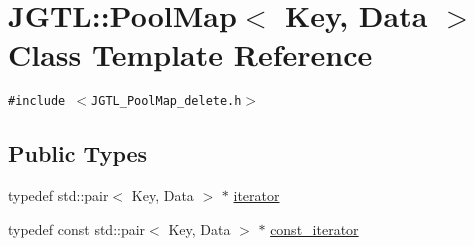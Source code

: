 \hypertarget{class_j_g_t_l_1_1_pool_map}{
\section{JGTL::Pool\-Map$<$ Key, Data $>$ Class Template Reference}
\label{class_j_g_t_l_1_1_pool_map}
}
{\tt \#include $<$JGTL\_\-Pool\-Map\_\-delete.h$>$}

\subsection*{Public Types}
\begin{CompactItemize}
\item 
typedef std::pair$<$ Key, Data $>$ $\ast$ \hyperlink{class_j_g_t_l_1_1_pool_map_b3af40821696ebcf9f62a3e9d91324ee}{iterator}
\item 
typedef const std::pair$<$ Key, Data $>$ $\ast$ \hyperlink{class_j_g_t_l_1_1_pool_map_123acfa775472141cec2bb3991c93d21}{const\_\-iterator}
\end{CompactItemize}
